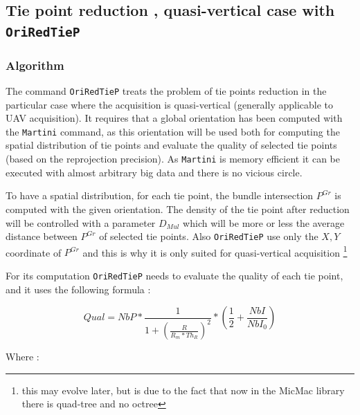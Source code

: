 
\subsection{Tie point reduction , quasi-vertical case with {\tt OriRedTieP}}



\subsubsection{Algorithm}

\label{TiePSel:GlobAlgo}

The command {\tt OriRedTieP} treats the problem of tie points reduction in the particular case
where the acquisition is quasi-vertical (generally applicable to UAV acquisition). 
It requires that a global orientation has been computed with the {\tt Martini}
command, as this orientation will be used both for computing the spatial distribution of
tie points and evaluate the quality of selected tie points (based on the reprojection precision).  As {\tt Martini} is memory efficient it can be executed
with almost arbitrary big data and there is no vicious circle.

To have a spatial distribution, for each tie point, the bundle intersection $P^{Gr}$ is computed
with the given orientation. The density of the tie point after reduction will be
controlled with a parameter $D_{Mul}$ which will be more or less the average
distance between $P^{Gr}$ of selected tie points. Also {\tt OriRedTieP} use only the $X,Y$
coordinate of $P^{Gr}$  and this is why it is only suited for quasi-vertical acquisition
\footnote{this may evolve later, but is due to the fact that now in the MicMac library there is quad-tree and no octree}


For its computation {\tt OriRedTieP} needs to evaluate the quality of each tie point, and it uses the
following formula :

\begin{equation}
   Qual= NbP * \frac{1}{1+(\frac{R}{R_m * Th_R})^2 } * (\frac{1}{2}+\frac{NbI}{NbI_0}) \label{QualTieP}
\end{equation}

Where :


